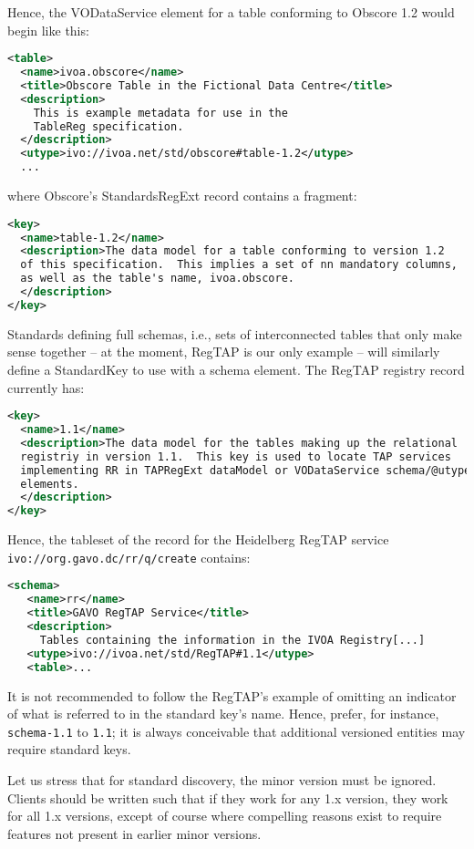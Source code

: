 \documentclass[11pt,a4paper]{ivoa}
\begin{document}
Hence, the VODataService  element for a table conforming to
Obscore 1.2 would begin like this:
\begin{lstlisting}[language=XML]
<table>
  <name>ivoa.obscore</name>
  <title>Obscore Table in the Fictional Data Centre</title>
  <description>
    This is example metadata for use in the
    TableReg specification.
  </description>
  <utype>ivo://ivoa.net/std/obscore#table-1.2</utype>
  ...
\end{lstlisting}
where Obscore's StandardsRegExt record contains a fragment:
\begin{lstlisting}[language=XML]
<key>
  <name>table-1.2</name>
  <description>The data model for a table conforming to version 1.2
  of this specification.  This implies a set of nn mandatory columns,
  as well as the table's name, ivoa.obscore.
  </description>
</key>
\end{lstlisting}

Standards defining full schemas, i.e., sets of interconnected tables
that only make sense together -- at the moment, RegTAP is our only
example -- will similarly define a StandardKey to use with a schema
element.  The RegTAP registry record currently has:

\begin{lstlisting}[language=XML]
<key>
  <name>1.1</name>
  <description>The data model for the tables making up the relational
  registriy in version 1.1.  This key is used to locate TAP services
  implementing RR in TAPRegExt dataModel or VODataService schema/@utype
  elements.
  </description>
</key>
\end{lstlisting}

Hence, the tableset of the record for the Heidelberg RegTAP service
\nolinkurl{ivo://org.gavo.dc/rr/q/create} contains:

\begin{lstlisting}[language=XML]
<schema>
   <name>rr</name>
   <title>GAVO RegTAP Service</title>
   <description>
     Tables containing the information in the IVOA Registry[...]
   <utype>ivo://ivoa.net/std/RegTAP#1.1</utype>
   <table>...
\end{lstlisting}

It is not recommended to follow the RegTAP's example of omitting an
indicator of what is referred to in the standard key's name.  Hence,
prefer, for instance, \verb|schema-1.1| to \verb|1.1|; it is always
conceivable that additional versioned entities may require standard
keys.

Let us stress that for standard discovery, the minor
version must be ignored.  Clients should be written such that if they
work for any 1.x version, they work for all 1.x versions, except of
course where compelling reasons exist to require features not present in
earlier minor versions.
\end{document}
